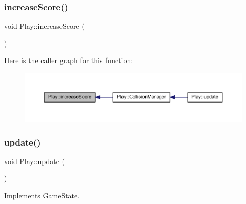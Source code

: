 \subsubsection{\texorpdfstring{increase\+Score()}{increaseScore()}}
{\footnotesize\ttfamily void Play\+::increase\+Score (\begin{DoxyParamCaption}{ }\end{DoxyParamCaption})}

Here is the caller graph for this function\+:
\nopagebreak
\begin{figure}[H]
\begin{center}
\leavevmode
\includegraphics[width=350pt]{class_play_af923e24bb8d24800e6481b18ce6f1e7b_icgraph}
\end{center}
\end{figure}
\mbox{\label{class_play_a8eaa457d009e35bfbf699b38b569e3b8}} 
\subsubsection{\texorpdfstring{update()}{update()}}
{\footnotesize\ttfamily void Play\+::update (\begin{DoxyParamCaption}{ }\end{DoxyParamCaption})\hspace{0.3cm}{\ttfamily [virtual]}}



Implements \hyperlink{class_game_state_ab2864bfa04f92f6966861a1f2883bda0}{Game\+State}.


